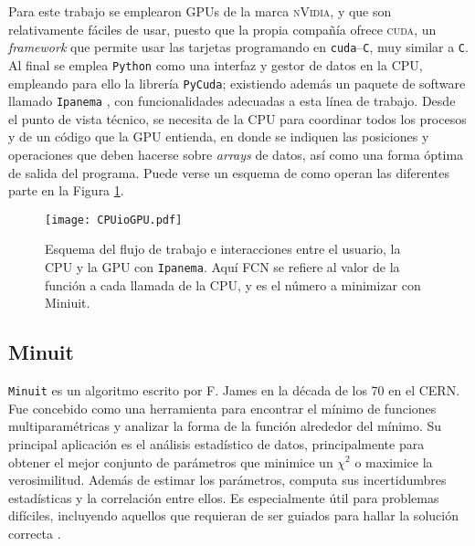 Para este trabajo se emplearon GPUs de la marca \textsc{nVidia}, y que son relativamente fáciles de usar, puesto que la propia compañía ofrece \textsc{cuda}, un \textit{framework} que permite usar las tarjetas programando en \texttt{cuda}--\texttt{C}, muy similar a \texttt{C}.
%
Al final se emplea \texttt{Python} como una interfaz y gestor de datos en la CPU, empleando para ello la librería \texttt{PyCuda}; existiendo además un paquete de software llamado \texttt{Ipanema} \cite{santos2017ipanema}, con funcionalidades adecuadas a esta línea de trabajo. Desde el punto de vista técnico, se necesita de la CPU para coordinar todos los procesos y de un código que la GPU entienda, en donde se indiquen las posiciones y operaciones que deben hacerse sobre \emph{arrays} de datos, así como una forma óptima de salida del programa. Puede verse un esquema de como operan las diferentes parte en la Figura \ref{fig:CPUioGPU}.





\begin{figure}[H]
  \centering
  \texttt{[image: CPUioGPU.pdf]}
  \caption{Esquema del flujo de trabajo e interacciones entre el usuario, la CPU y la GPU con \texttt{Ipanema}. Aquí FCN se refiere al valor de la función a cada llamada de la CPU, y es el número a minimizar con Miniuit.} \label{fig:CPUioGPU}
\end{figure}


\subsection{Minuit}

\texttt{Minuit} es un algoritmo escrito por F. James en la década de los 70 en el CERN. Fue concebido como una herramienta para encontrar el mínimo de funciones multiparamétricas y analizar la forma de la función alrededor del mínimo. Su principal aplicación es el análisis estadístico de datos, principalmente para obtener el mejor conjunto de parámetros que minimice un $\chi^2$ o maximice la verosimilitud. Además de estimar los parámetros, computa sus incertidumbres estadísticas y la correlación entre ellos. Es especialmente útil para problemas difíciles, incluyendo aquellos que requieran de ser guiados para hallar la solución correcta 
\cite{James:1975dr}.

